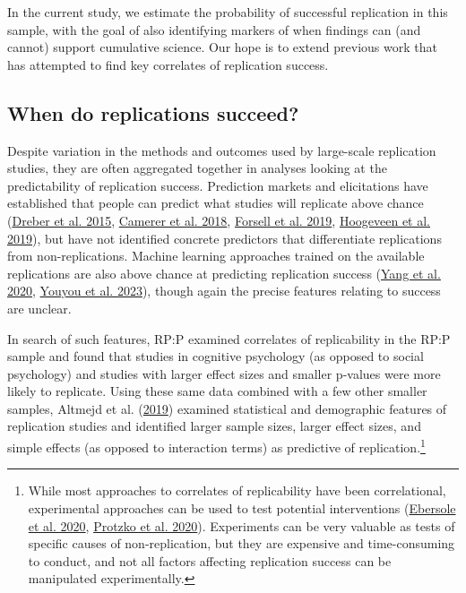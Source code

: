 \documentclass[
  english,
  a4paper,
]{article}
\begin{document}
In the current study, we estimate the probability of successful replication in this sample, with the goal of also identifying markers of when findings can (and cannot) support cumulative science. Our hope is to extend previous work that has attempted to find key correlates of replication success.

\hypertarget{when-do-replications-succeed}{%
\subsection{When do replications succeed?}\label{when-do-replications-succeed}}

Despite variation in the methods and outcomes used by large-scale replication studies, they are often aggregated together in analyses looking at the predictability of replication success. Prediction markets and elicitations have established that people can predict what studies will replicate above chance (\protect\hyperlink{ref-dreber2015}{Dreber et al. 2015}, \protect\hyperlink{ref-camerer2018}{Camerer et al. 2018}, \protect\hyperlink{ref-forsell2019}{Forsell et al. 2019}, \protect\hyperlink{ref-hoogeveen2019}{Hoogeveen et al. 2019}), but have not identified concrete predictors that differentiate replications from non-replications. Machine learning approaches trained on the available replications are also above chance at predicting replication success (\protect\hyperlink{ref-yang2020}{Yang et al. 2020}, \protect\hyperlink{ref-youyou2023}{Youyou et al. 2023}), though again the precise features relating to success are unclear.

In search of such features, RP:P examined correlates of replicability in the RP:P sample and found that studies in cognitive psychology (as opposed to social psychology) and studies with larger effect sizes and smaller p-values were more likely to replicate. Using these same data combined with a few other smaller samples, Altmejd et al. (\protect\hyperlink{ref-altmejd2019}{2019}) examined statistical and demographic features of replication studies and identified larger sample sizes, larger effect sizes, and simple effects (as opposed to interaction terms) as predictive of replication.\footnote{While most approaches to correlates of replicability have been correlational, experimental approaches can be used to test potential interventions (\protect\hyperlink{ref-ebersole2020}{Ebersole et al. 2020}, \protect\hyperlink{ref-protzko2020}{Protzko et al. 2020}). Experiments can be very valuable as tests of specific causes of non-replication, but they are expensive and time-consuming to conduct, and not all factors affecting replication success can be manipulated experimentally.}
\end{document}
